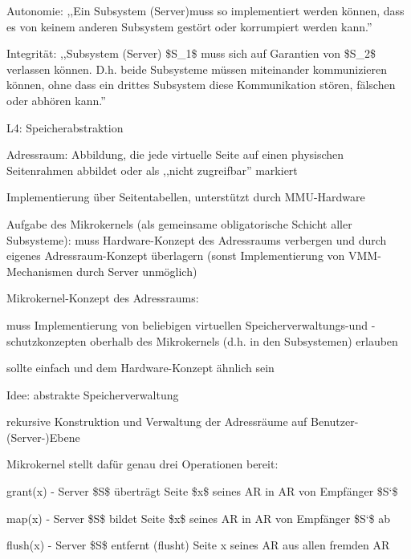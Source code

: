\documentclass[a4paper]{article}
\begin{document}
\begin{multicols}{3}
    \begin{enumerate*}
        \item
        Autonomie: ,,Ein Subsystem (Server)muss so implementiert werden
        können, dass es von keinem anderen Subsystem gestört oder korrumpiert
        werden kann.''
        \item
        Integrität: ,,Subsystem (Server) \$S\_1\$ muss sich auf Garantien von
        \$S\_2\$ verlassen können. D.h. beide Subsysteme müssen miteinander
        kommunizieren können, ohne dass ein drittes Subsystem diese
        Kommunikation stören, fälschen oder abhören kann.''
    \end{enumerate*}

    L4: Speicherabstraktion

    \begin{itemize*}
        \item
        Adressraum: Abbildung, die jede virtuelle Seite auf einen physischen
        Seitenrahmen abbildet oder als ,,nicht zugreifbar'' markiert
        \item
        Implementierung über Seitentabellen, unterstützt durch MMU-Hardware
        \item
        Aufgabe des Mikrokernels (als gemeinsame obligatorische Schicht aller
        Subsysteme): muss Hardware-Konzept des Adressraums verbergen und durch
        eigenes Adressraum-Konzept überlagern (sonst Implementierung von
        VMM-Mechanismen durch Server unmöglich)
        \item
        Mikrokernel-Konzept des Adressraums:
        \begin{itemize*}
            \item muss Implementierung von beliebigen virtuellen Speicherverwaltungs-und -schutzkonzepten oberhalb des Mikrokernels (d.h. in den Subsystemen) erlauben
            \item sollte einfach und dem Hardware-Konzept ähnlich sein
        \end{itemize*}
        \item
        Idee: abstrakte Speicherverwaltung
        \begin{itemize*}
            \item rekursive Konstruktion und Verwaltung der Adressräume auf Benutzer-(Server-)Ebene
            \item Mikrokernel stellt dafür genau drei Operationen bereit: \begin{enumerate*} \item grant(x) - Server \$S\$ überträgt Seite \$x\$ seines AR in AR von Empfänger \$S`\$ \item map(x) - Server \$S\$ bildet Seite \$x\$ seines AR in AR von Empfänger \$S`\$ ab \item flush(x) - Server \$S\$ entfernt (flusht) Seite x seines AR aus allen fremden AR \end{enumerate*}
        \end{itemize*}
    \end{itemize*}


\end{multicols}
\end{document}
